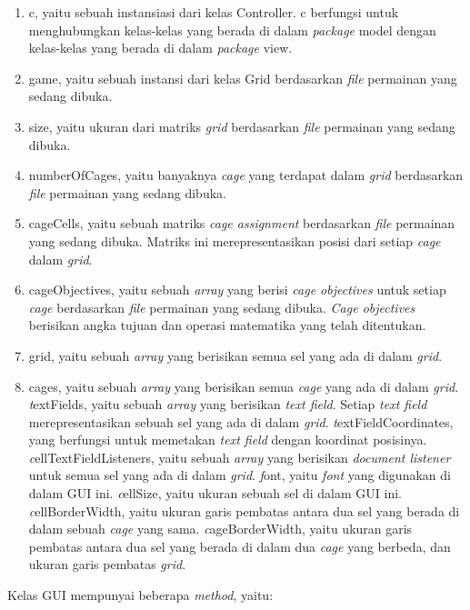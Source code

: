 \begin{enumerate}
\item c, yaitu sebuah instansiasi dari kelas Controller. c berfungsi untuk menghubungkan kelas-kelas yang berada di dalam \textit{package} model dengan kelas-kelas yang berada di dalam \textit{package} view.
\item game, yaitu sebuah instansi dari kelas Grid berdasarkan \textit{file} permainan yang sedang dibuka.
\item size, yaitu ukuran dari matriks \textit{grid} berdasarkan \textit{file} permainan yang sedang dibuka.
\item numberOfCages, yaitu banyaknya \textit{cage} yang terdapat dalam \textit{grid} berdasarkan \textit{file} permainan yang sedang dibuka.
\item cageCells, yaitu sebuah matriks \textit{cage assignment} berdasarkan \textit{file} permainan yang sedang dibuka. Matriks ini merepresentasikan posisi dari setiap \textit{cage} dalam \textit{grid}.
\item cageObjectives, yaitu sebuah \textit{array} yang berisi \textit{cage objectives} untuk setiap \textit{cage} berdasarkan \textit{file} permainan yang sedang dibuka. \textit{Cage objectives} berisikan angka tujuan dan operasi matematika yang telah ditentukan.
\item grid, yaitu sebuah \textit{array} yang berisikan semua sel yang ada di dalam \textit{grid}.
\item cages, yaitu sebuah \textit{array} yang berisikan semua \textit{cage} yang ada di dalam \textit{grid}.
\textit textFields, yaitu sebuah \textit{array} yang berisikan \textit{text field}. Setiap \textit{text field} merepresentasikan sebuah sel yang ada di dalam \textit{grid}.
\textit textFieldCoordinates, yang berfungsi untuk memetakan \textit{text field} dengan koordinat posisinya.
\textit cellTextFieldListeners, yaitu sebuah \textit{array} yang berisikan \textit{document listener} untuk semua sel yang ada di dalam \textit{grid}.
\textit font, yaitu \textit{font} yang digunakan di dalam GUI ini.
\textit cellSize, yaitu ukuran sebuah sel di dalam GUI ini.
\textit cellBorderWidth, yaitu ukuran garis pembatas antara dua sel yang berada di dalam sebuah \textit{cage} yang sama.
\textit cageBorderWidth, yaitu ukuran garis pembatas antara dua sel yang berada di dalam dua \textit{cage} yang berbeda, dan ukuran garis pembatas \textit{grid}.
\end{enumerate}

Kelas GUI mempunyai beberapa \textit{method}, yaitu:

